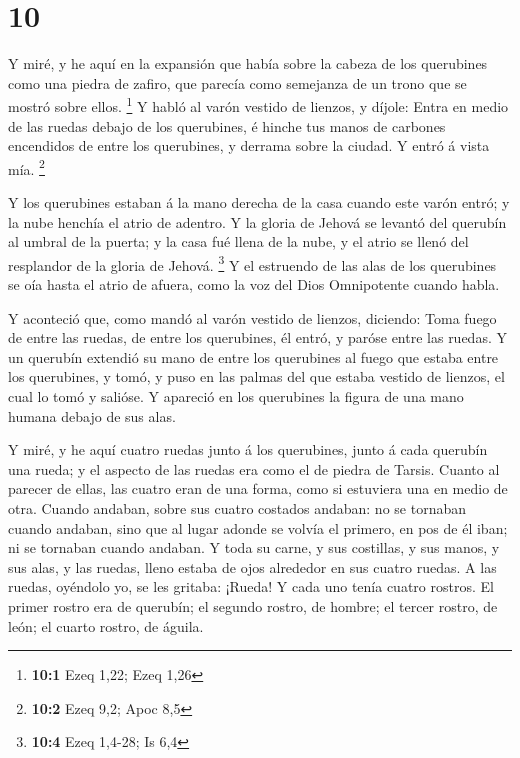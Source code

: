 \hypertarget{section-9}{%
\section{10}\label{section-9}}

 Y miré, y he aquí en la expansión que había sobre la
cabeza de los querubines como una piedra de zafiro, que parecía como
semejanza de un trono que se mostró sobre ellos. \footnote{\textbf{10:1}
  Ezeq 1,22; Ezeq 1,26}  Y habló al varón vestido de
lienzos, y díjole: Entra en medio de las ruedas debajo de los
querubines, é hinche tus manos de carbones encendidos de entre los
querubines, y derrama sobre la ciudad. Y entró á vista mía. \footnote{\textbf{10:2}
  Ezeq 9,2; Apoc 8,5}

 Y los querubines estaban á la mano derecha de la casa
cuando este varón entró; y la nube henchía el atrio de adentro.
 Y la gloria de Jehová se levantó del querubín al umbral
de la puerta; y la casa fué llena de la nube, y el atrio se llenó del
resplandor de la gloria de Jehová. \footnote{\textbf{10:4} Ezeq 1,4-28;
  Is 6,4}  Y el estruendo de las alas de los querubines se
oía hasta el atrio de afuera, como la voz del Dios Omnipotente cuando
habla.

 Y aconteció que, como mandó al varón vestido de lienzos,
diciendo: Toma fuego de entre las ruedas, de entre los querubines, él
entró, y paróse entre las ruedas.  Y un querubín extendió
su mano de entre los querubines al fuego que estaba entre los
querubines, y tomó, y puso en las palmas del que estaba vestido de
lienzos, el cual lo tomó y salióse.  Y apareció en los
querubines la figura de una mano humana debajo de sus alas.

 Y miré, y he aquí cuatro ruedas junto á los querubines,
junto á cada querubín una rueda; y el aspecto de las ruedas era como el
de piedra de Tarsis.  Cuanto al parecer de ellas, las
cuatro eran de una forma, como si estuviera una en medio de otra.
 Cuando andaban, sobre sus cuatro costados andaban: no se
tornaban cuando andaban, sino que al lugar adonde se volvía el primero,
en pos de él iban; ni se tornaban cuando andaban.  Y toda
su carne, y sus costillas, y sus manos, y sus alas, y las ruedas, lleno
estaba de ojos alrededor en sus cuatro ruedas.  A las
ruedas, oyéndolo yo, se les gritaba: ¡Rueda!  Y cada uno
tenía cuatro rostros. El primer rostro era de querubín; el segundo
rostro, de hombre; el tercer rostro, de león; el cuarto rostro, de
águila.

